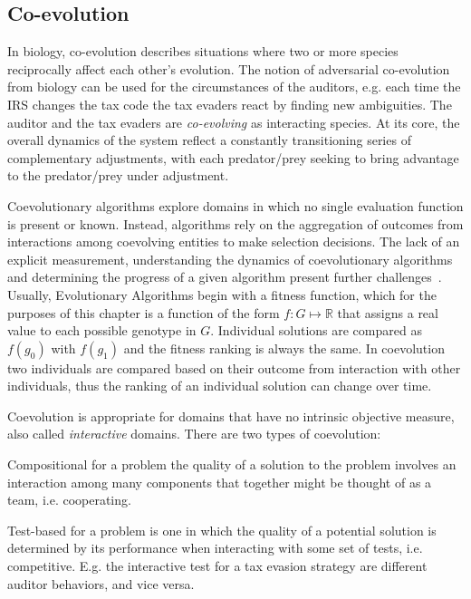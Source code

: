 \subsection{Co-evolution}
\label{sec:co-evolution}

In biology, co-evolution describes situations where two or more
species reciprocally affect each other's evolution. The notion of
adversarial co-evolution from biology can be used for the
circumstances of the auditors, e.g. each time the IRS changes the tax
code the tax evaders react by finding new ambiguities. The auditor and
the tax evaders are \textit{co-evolving} as interacting species. At
its core, the overall dynamics of the system reflect a constantly
transitioning series of complementary adjustments, with each
predator/prey seeking to bring advantage to the predator/prey under
adjustment.

Coevolutionary algorithms explore domains in which no single
evaluation function is present or known. Instead, algorithms rely on
the aggregation of outcomes from interactions among coevolving
entities to make selection decisions. The lack of an explicit
measurement, understanding the dynamics of coevolutionary algorithms
and determining the progress of a given algorithm present further
challenges~\citep{popovici2012coevolutionary}. Usually, Evolutionary
Algorithms begin with a fitness function, which for the purposes of
this chapter is a function of the form $f: G \mapsto \mathbb{R}$ that
assigns a real value to each possible genotype in $G$. Individual
solutions are compared as $f(g_0)$ with $f(g_1)$ and the fitness
ranking is always the same. In coevolution two individuals are
compared based on their outcome from interaction with other
individuals, thus the ranking of an individual solution can change
over time.

Coevolution is appropriate for domains that have no intrinsic
objective measure, also called \textit{interactive} domains. There are
two types of coevolution:
\begin{inparadesc}
\item [Compositional] for a problem the quality of a solution to the
  problem involves an interaction among many components that together
  might be thought of as a team, i.e. cooperating.
\item [Test-based] for a problem is one in which the quality of a
  potential solution is determined by its performance when interacting
  with some set of tests, i.e. competitive. E.g. the interactive test
  for a tax evasion strategy are different auditor behaviors, and vice
  versa.
\end{inparadesc}

